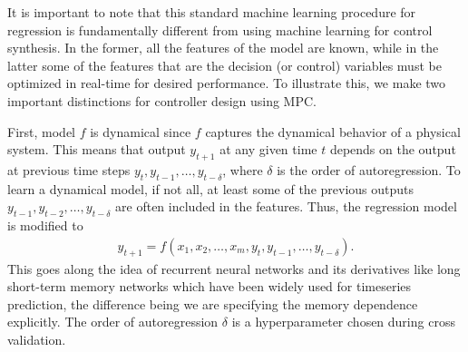 It is important to note that this standard machine learning procedure for regression is fundamentally different from using machine learning for control synthesis.
In the former, all the features of the model are known, while in the latter some of the features that are the decision (or control) variables must be optimized in real-time for desired performance.
To illustrate this, we make two important distinctions for controller design using MPC.

First, model \(f\) is dynamical since \(f\) captures the dynamical behavior of a physical system. This means that output \(y_{t+1}\) at any given time \(t\) depends on the output at previous time steps \(y_{t}, y_{t-1}, \dots, y_{t-\delta}\), where \(\delta\) is the order of autoregression. To learn a dynamical model, if not all, at least some of the previous outputs \( y_{t-1}, y_{t-2}, \dots, y_{t-\delta}\) are often included in the features. Thus, the regression model is modified to
\begin{align}
y_{t+1} = f\left( x_1, x_2, \dots, x_m, y_{t}, y_{t-1}, \dots, y_{t-\delta} \right).
\label{E:mllags}
\end{align}
This goes along the idea of recurrent neural networks \cite{Lipton2015} and its derivatives like long short-term memory networks \cite{Hochreiter1997} which have been widely used for timeseries prediction, the difference being we are specifying the memory dependence explicitly.
The order of autoregression \(\delta\) is a hyperparameter chosen during cross validation.

